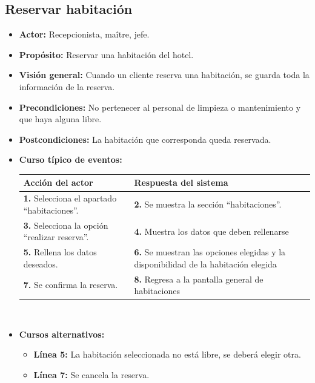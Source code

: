 \documentclass[spanish,a4paper,11pt, twoside]{report}	%
\begin{document}
	\subsection{Reservar habitación}
		\begin{itemize}
			\item \textbf{Actor:} Recepcionista, maître, jefe.
			\item \textbf{Propósito: } Reservar una habitación del hotel.
			\item \textbf{Visión general:} Cuando un cliente reserva una habitación, se
				guarda toda la información de la reserva.
			\item \textbf{Precondiciones:} No pertenecer al personal de limpieza o mantenimiento y que haya alguna libre.
			\item \textbf{Postcondiciones:} La habitación que corresponda queda reservada.
			\item \textbf{Curso típico de eventos:} 	\\
				\begin{tabular}{|p{6cm}||p{6cm}|}
				\hline
				\textbf{Acción del actor} & \textbf{Respuesta del sistema} \\ \hline
				\textbf{1.} Selecciona el apartado  ``habitaciones''. & 
				\textbf{2.} Se muestra la sección ``habitaciones''.\\ \hline 
				\textbf{3.} Selecciona la opción ``realizar reserva''. & 
				\textbf{4.} Muestra los datos que deben rellenarse  \\ \hline
				\textbf{5.} Rellena los datos deseados. & 
				\textbf{6.} Se muestran las opciones elegidas y la disponibilidad de la habitación elegida \\ \hline
				\textbf{7.} Se confirma la reserva. & 
				\textbf{8.} Regresa a la pantalla general de habitaciones\\ \hline
			\end{tabular}
			\\
			\item \textbf{Cursos alternativos:} 
			\begin{itemize}
			\item  \textbf{Línea 5:} La habitación seleccionada no está libre, se deberá elegir otra.
			\item  \textbf{Línea 7:} Se cancela la reserva. \\
			\end {itemize}
		\end {itemize}

\end{document}
